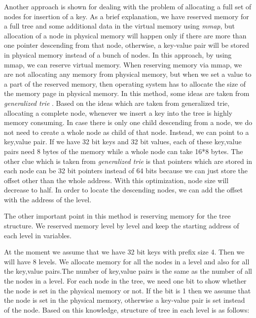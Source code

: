 \documentclass[12pt]{report}
\begin{document}
Another approach is shown for dealing with the problem of allocating a full set of nodes for insertion of a key. As a brief explanation, we have reserved memory for a full tree and some additional data in the virtual memory using \textit{mmap}, but allocation of a node in physical memory will happen only if there are more than one pointer descending from that node, otherwise, a key-value pair will be stored in physical memory instead of a bunch of nodes. In this approach, by using mmap, we can reserve virtual memory. When reserving memory via mmap, we are not allocating any memory from physical memory, but when we set a value to a part of the reserved memory, then operating system has to allocate the size of the memory page in physical memory. In this method, some ideas are taken from \textit{generalized trie} \cite{Boehm}. Based on the ideas which are taken from generalized trie, allocating a complete node, whenever we insert a key into the tree is highly memory consuming. In case there is only one child descending from a node, we do not need to create a whole node as child of that node. Instead, we can point to a key,value pair. If we have 32 bit keys and 32 bit values, each of these key,value pairs need 8 bytes of the memory while a whole node can take 16*8 bytes. The other clue which is taken from \textit{generalized trie} is that pointers which are stored in each node can be 32 bit pointers instead of 64 bits because we can just store the offset other than the whole address. With this optimization, node size will decrease to half. In order to locate the descending nodes, we can add the offset with the address of the level. 

 The other important point in this method is reserving memory for the tree structure. We reserved memory level by level and keep the starting address of each level in variables. 

At the moment we assume that we have 32 bit keys with prefix size 4. Then we will have 8 levels. We allocate memory for all the nodes in a level and also for all the key,value pairs.The number of key,value pairs is the same as the number of all the nodes in a level. For each node in the tree, we need one bit to show whether the node is set in the physical memory or not. If the bit is 1 then we assume that the node is set in the physical memory, otherwise a key-value pair is set instead of the node. Based on this knowledge, structure of tree in each level is as follows:
 
\end{document}
